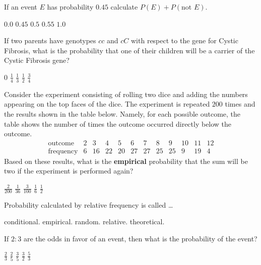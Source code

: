 \documentclass[answers,12pt]{exam}
\begin{document}
\begin{questions}
\question If an event $E$ has probability $0.45$
calculate $P\left(E\right)+P\left(\text{not $E$}\right)$.\\
\begin{oneparchoices}
\choice $0.0$
\choice $0.45$
\choice $0.5$
\choice $0.55$
\correctchoice $1.0$
\end{oneparchoices}

\question If two parents have genotypes $cc$ and $cC$
with respect to the gene for Cystic Fibrosis, what
is the probability that one of their children will be
a carrier of the Cystic Fibrosis gene?\\
\begin{oneparchoices}
\choice $0$
\choice $\frac{1}{4}$
\choice $\frac{1}{3}$
\correctchoice $\frac{1}{2}$
\choice $\frac{3}{4}$
\end{oneparchoices}

\question Consider the experiment consisting
of rolling two dice and adding the numbers
appearing on the top faces of the dice.
The experiment is repeated $200$ times and the
results shown in the table below. Namely, 
for each possible outcome, the table shows the number
of times the outcome occurred directly below the outcome.
\[\begin{array}{r|ccccccccccc}
\text{outcome}&2&3&4&5&6&7&8&9&10&11&12\\\hline
\text{frequency}&6&16&22&20&27&27&25&25&9&19&4
\end{array}\]
Based on these results, what is the {\bf empirical} probability
that the sum will be two if the experiment is performed again?\\
\begin{oneparchoices}
\choice $\frac{2}{200}$
\choice $\frac{1}{36}$
\correctchoice $\frac{3}{100}$
\choice $\frac{1}{6}$
\choice $\frac{1}{2}$
\end{oneparchoices}

\question Probability calculated by relative frequency is called \dots\\
\begin{oneparchoices}
\choice conditional.
\correctchoice empirical.
\choice random.
\choice relative.
\choice theoretical.
\end{oneparchoices}

\question If $2:3$ are the odds in favor
of an event, then what is the probability of the event?\\
\begin{oneparchoices}
\choice $\frac{2}{3}$ %
\correctchoice $\frac{2}{5}$
\choice $\frac{3}{5}$ %
\choice $\frac{3}{2}$ %
\choice $\frac{5}{3}$ %
\end{oneparchoices}
\end{questions}
\end{document}
